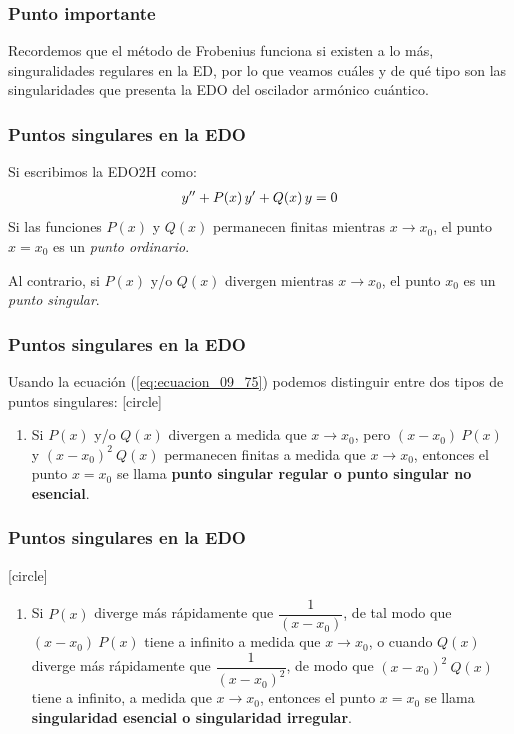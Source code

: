 \documentclass[12pt]{beamer}
\begin{document}
\begin{frame}
\frametitle{Punto importante}
Recordemos que el método de Frobenius funciona si existen a lo más, singuralidades regulares en la ED, por lo que veamos cuáles y de qué tipo son las singularidades que presenta la EDO del oscilador armónico cuántico. 
\end{frame}
\begin{frame}
\frametitle{Puntos singulares en la EDO}
Si escribimos la EDO2H como:
\pause
\begin{align}
{y}^{\prime \prime} + P(x) \, {y}^{\prime} + Q(x) \, y = 0
\label{eq:ecuacion_09_75}
\end{align}
\pause
Si las funciones $P(x)$ y $Q(x)$ permanecen finitas mientras $x \to x_{0}$, el punto $x = x_{0}$ es un \emph{punto ordinario}.
\par
\pause
Al contrario, si $P(x)$ y/o $Q(x)$ divergen mientras $x \to x_{0}$, el punto $x_{0}$ es un \emph{punto singular}.
\end{frame}
\begin{frame}
\frametitle{Puntos singulares en la EDO}
Usando la ecuación (\ref{eq:ecuacion_09_75}) podemos distinguir entre dos tipos de puntos singulares:
\pause
{}
[circle]
\begin{enumerate}[<+->]
\item Si $P(x)$ y/o $Q(x)$ divergen a medida que $x \to x_{0}$, pero $(x - x_{0}) \: P(x)$ y $(x - x_{0})^{2} \: Q(x)$ permanecen finitas a medida que $x \to x_{0}$, entonces el punto $x = x_{0}$ se llama \textbf{punto singular regular o punto singular no esencial}.
\seti
\end{enumerate}
\end{frame}
\begin{frame}
\frametitle{Puntos singulares en la EDO}
[circle]
\begin{enumerate}[<+->]
\conti
\item Si $P(x)$ diverge más rápidamente que $\dfrac{1}{(x - x_{0})}$, de tal modo que $(x - x_{0}) \: P(x)$ tiene a infinito a medida que $x \to x_{0}$, o cuando $Q(x)$ diverge más rápidamente que $\dfrac{1}{(x - x_{0})^{2}}$, \pause de modo que $(x - x_{0})^{2} \: Q(x)$ tiene a infinito, a medida que $x \to x_{0}$, entonces el punto $x = x_{0}$ se llama \textbf{singularidad esencial o singularidad irregular}.
\end{enumerate}
\end{frame}
\end{document}
